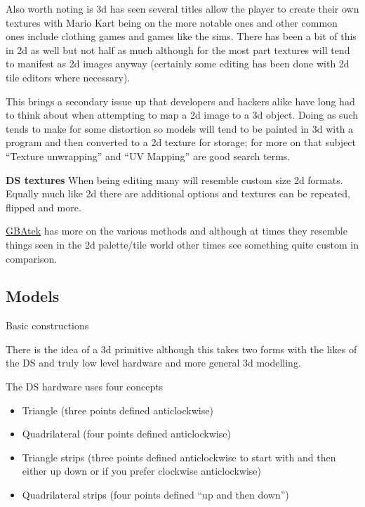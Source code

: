 \documentclass[
]{book}
\providecommand{\tightlist}{%
  \setlength{\itemsep}{0pt}\setlength{\parskip}{0pt}}
\begin{document}
Also worth noting is 3d has seen several titles allow the player to create their own textures with Mario Kart being on the more notable ones and other common ones include clothing games and games like the sims. There has been a bit of this in 2d as well but not half as much although for the most part textures will tend to manifest as 2d images anyway (certainly some editing has been done with 2d tile editors where necessary).

This brings a secondary issue up that developers and hackers alike have long had to think about when attempting to map a 2d image to a 3d object. Doing as such tends to make for some distortion so models will tend to be painted in 3d with a program and then converted to a 2d texture for storage; for more on that subject ``Texture unwrapping'' and ``UV Mapping'' are good search terms.

\textbf{DS textures} When being editing many will resemble custom size 2d formats. Equally much like 2d there are additional options and textures can be repeated, flipped and more.

\href{http://problemkaputt.de/gbatek.htm\#ds3dtextureattributes}{GBAtek} has more on the various methods and although at times they resemble things seen in the 2d palette/tile world other times see something quite custom in comparison.

\hypertarget{models}{%
\subsection{Models}\label{models}}

Basic constructions

There is the idea of a 3d primitive although this takes two forms with the likes of the DS and truly low level hardware and more general 3d modelling.

The DS hardware uses four concepts

\begin{itemize}
\tightlist
\item
  Triangle (three points defined anticlockwise)
\item
  Quadrilateral (four points defined anticlockwise)
\item
  Triangle strips (three points defined anticlockwise to start with and then either up down or if you prefer clockwise anticlockwise)
\item
  Quadrilateral strips (four points defined ``up and then down'')
\end{itemize}
\end{document}
